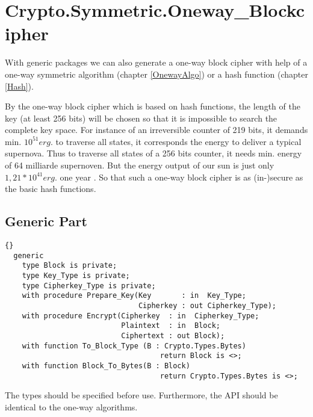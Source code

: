 \chapter{Crypto.Symmetric.Oneway\_Blockcipher}\label{Oneway-Blockcipher}
With generic packages we can also generate a one-way block cipher with help of a one-way symmetric algorithm (chapter \ref{OnewayAlgo}) or a hash function (chapter \ref{Hash}).

By the one-way block cipher which is based on hash functions, the length of the key (at least 256 bits) will be chosen so that it is impossible to search the complete key space. For instance of an irreversible counter of 219 bits, it demands min. $10^{51}erg.$ to traverse all states, it corresponds the energy to deliver a typical supernova. Thus to traverse all states of a 256 bits counter, it needs min. energy of 64 milliarde supernoven. But the energy output of our sun is just only $1,21*10^{41}erg.$ one year \cite{DBLP:books/daglib/0021657}. So that such a one-way block cipher is as (in-)secure as the basic hash functions.
\section{Generic Part}
\begin{lstlisting}{}
  generic
    type Block is private;
    type Key_Type is private;
    type Cipherkey_Type is private;
    with procedure Prepare_Key(Key       : in  Key_Type;
                               Cipherkey : out Cipherkey_Type);
    with procedure Encrypt(Cipherkey  : in  Cipherkey_Type;
                           Plaintext  : in  Block;
                           Ciphertext : out Block);
    with function To_Block_Type (B : Crypto.Types.Bytes) 
    							    return Block is <>;
    with function Block_To_Bytes(B : Block) 
    							    return Crypto.Types.Bytes is <>;
\end{lstlisting}
The types should be specified before use. Furthermore, the API should be identical to the one-way algorithms.\\
